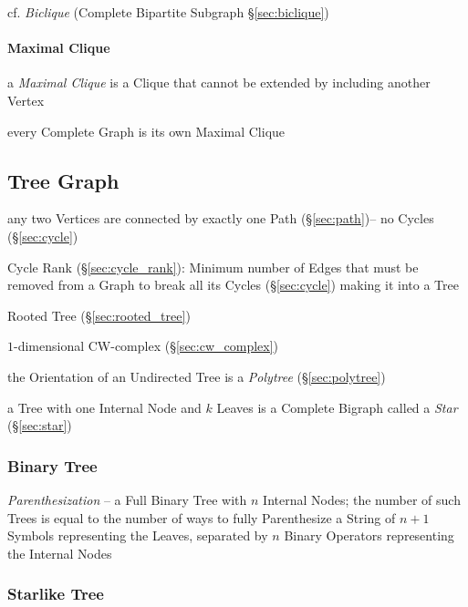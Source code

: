 cf. \emph{Biclique} (Complete Bipartite Subgraph \S\ref{sec:biclique})



\paragraph{Maximal Clique}\label{sec:maximal_clique}\hfill

a \emph{Maximal Clique} is a Clique that cannot be extended by including
another Vertex

every Complete Graph is its own Maximal Clique



\subsection{Tree Graph}\label{sec:tree_graph}

any two Vertices are connected by exactly one Path (\S\ref{sec:path})-- no
Cycles (\S\ref{sec:cycle})

Cycle Rank (\S\ref{sec:cycle_rank}): Minimum number of Edges that must be
removed from a Graph to break all its Cycles (\S\ref{sec:cycle}) making it into
a Tree

Rooted Tree (\S\ref{sec:rooted_tree})

$1$-dimensional CW-complex (\S\ref{sec:cw_complex})

the Orientation of an Undirected Tree is a \emph{Polytree}
(\S\ref{sec:polytree})

a Tree with one Internal Node and $k$ Leaves is a Complete Bigraph called a
\emph{Star} (\S\ref{sec:star})



\subsubsection{Binary Tree}\label{sec:binary_tree}

\emph{Parenthesization} -- a Full Binary Tree with $n$ Internal Nodes; the
number of such Trees is equal to the number of ways to fully Parenthesize a
String of $n+1$ Symbols representing the Leaves, separated by $n$ Binary
Operators representing the Internal Nodes



\subsubsection{Starlike Tree}\label{sec:starlike_tree}

